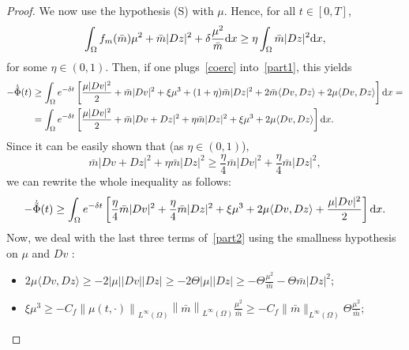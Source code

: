 \documentclass[10pt,a4paper,nouppercase,nowrite]{article}
\numberwithin{equation}{section}
\newcommand{\di}{{\rm d}}
\newcommand{\Sp}{{\textsc (S)} }
\theoremstyle{definition}
\begin{document}
\begin{proof}
	We now use the hypothesis \Sp with $\mu$. 
		Hence, for all $t \in [0,T]$,
		\begin{equation}
			\int_{\Omega} f_m (\bar{m})\mu^2 + \bar{m}|Dz|^2 + \delta \frac{\mu^2}{\bar{m}} \di x \geq \eta \int_{\Omega} \bar{m} |Dz|^2 \di x,
			\label{coerc}
		\end{equation}
		for some $\eta \in (0,1)$.
		Then, if one plugs~\eqref{coerc} into~\eqref{part1}, this yields
		\begin{equation*}
			\begin{split}
				-\dot{\tilde{\Phi}}(t) &\geq \int_{\Omega} e^{-\delta t} \left[ \frac{\mu |Dv|^2}{2} + \bar{m}|Dv|^2 + \xi \mu^3+ (1+\eta)\bar{m}|Dz|^2  + 2\bar{m} \langle Dv,Dz \rangle + 2\mu \langle Dv,Dz \rangle \right] \di x = \\
				&=\int_{\Omega} e^{-\delta t} \left[ \frac{\mu|Dv|^2}{2}+ \bar{m}|Dv+Dz|^2 + \eta \bar{m}|Dz|^2 +\xi  \mu^3 + 2\mu \langle Dv,Dz \rangle \right] \di x.
			\end{split}
		\end{equation*}
		Since it can be easily shown that (as $\eta \in (0,1)$),
		\begin{equation*}
			\bar{m}|Dv+Dz|^2 + \eta \bar{m} |Dz|^2 \geq \frac{\eta}{4} \bar{m} |Dv|^2 + \frac{\eta}{4} \bar{m} |Dz|^2,
		\end{equation*}
		we can rewrite the whole inequality as follows:
		\begin{equation}
			-\dot{\tilde{\Phi}}(t) \geq \int_{\Omega} e^{-\delta t} \left[ \frac{\eta}{4} \bar{m}|Dv|^2 + \frac{\eta}{4} \bar{m}|Dz|^2 +\xi \mu^3 + 2\mu \langle Dv,Dz \rangle + \frac{\mu|Dv|^2}{2} \right] \di x.
			\label{part2}
		\end{equation}
		Now, we deal with the last three terms of~\eqref{part2} using the smallness hypothesis on $\mu$ and $Dv$ :
		\begin{itemize}
			\item $2 \mu \langle Dv,Dz \rangle \geq - 2 |\mu| |Dv| |Dz| \geq - 2 \Theta |\mu| |Dz| \geq - \Theta \frac{\mu^2}{\bar{m}} - \Theta \bar{m}|Dz|^2;$
			\item $\xi \mu^3 \geq - C_f \left \| \mu(t,\cdot) \right \|_{L^{\infty}(\Omega)} \left \| \bar{m} \right \|_{L^{\infty}(\Omega)} \frac{\mu^2}{\bar{m}} \geq - 
			C_f \|\bar{m}\|_{L^{\infty}(\Omega)} \Theta \frac{\mu^2}{\bar{m}};$

\end{itemize}
\end{proof}
\end{document}
